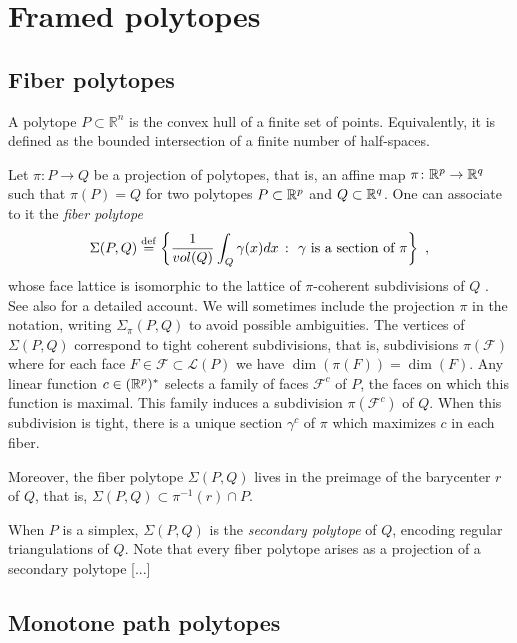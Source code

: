 
\section{Framed polytopes}


\subsection{Fiber polytopes}

A polytope $P \subset \mathbb{R}^n$ is the convex hull of a finite set of points.
Equivalently, it is defined as the bounded intersection of a finite number of half-spaces.

Let $\pi \colon P \to Q$ be a projection of polytopes, that is, an affine map $\pi \colon \mathbb{R}^p \to \mathbb{R}^q$ such that $\pi(P)=Q$ for two polytopes $P\subset \mathbb{R}^p$ and $Q \subset \mathbb{R}^q$.
One can associate to it the \emph{fiber polytope} \[\Sigma(P,Q) \stackrel{\mathrm{def}}{=} \left\{ \frac{1}{vol(Q)}\int_Q \gamma(x)dx \ \colon \ \gamma \text{ is a section of }\pi \right\} \ , \] whose face lattice is isomorphic to the lattice of $\pi$-coherent subdivisions of $Q$ \cite{BilleraSturmfels92}.
See also \cite[Chapter 9]{Ziegler95} for a detailed account.
We will sometimes include the projection $\pi$ in the notation, writing $\Sigma_\pi(P,Q)$ to avoid possible ambiguities. 
The vertices of $\Sigma(P,Q)$ correspond to tight coherent subdivisions, that is, subdivisions $\pi(\mathcal{F})$ where for each face $F \in \mathcal{F}\subset\mathcal{L}(P)$ we have $\dim(\pi(F))=\dim(F)$.
Any linear function $c\in (\mathbb{R}^p)^{*}$ selects a family of faces $\mathcal{F}^c$ of $P$, the faces on which this function is maximal. 
This family induces a subdivision $\pi(\mathcal{F}^c)$ of $Q$.
When this subdivision is tight, there is a unique section $\gamma^c$ of $\pi$ which maximizes $c$ in each fiber.

Moreover, the fiber polytope $\Sigma(P,Q)$ lives in the preimage of the barycenter $r$ of $Q$, that is, $\Sigma(P,Q)\subset\pi^{-1}(r)\cap P$.

When $P$ is a simplex, $\Sigma(P,Q)$ is the \emph{secondary polytope} of $Q$, encoding regular triangulations of $Q$.
Note that every fiber polytope arises as a projection of a secondary polytope [...]

\subsection{Monotone path polytopes}

